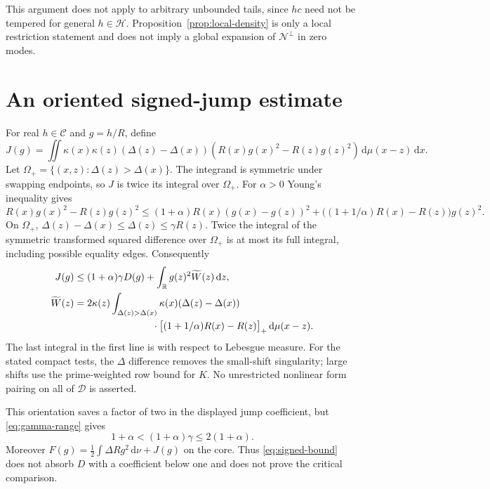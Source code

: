 \documentclass[11pt,a4paper]{article}
\newcommand{\R}{\mathbb R}
\newcommand{\HH}{\mathcal H}
\newcommand{\DD}{\mathcal D}
\newcommand{\CC}{\mathcal C}
\newcommand{\NN}{\mathcal N}
\newcommand{\dd}{\,\mathrm d}
\theoremstyle{definition}
\theoremstyle{remark}
\numberwithin{equation}{section}
\begin{document}
This argument does not apply to arbitrary unbounded tails, since $hc$
need not be tempered for general $h\in\HH$. Proposition~\ref{prop:local-density}
is only a local restriction statement and does not imply a global
expansion of $\NN^\perp$ in zero modes.

\section{An oriented signed-jump estimate}\label{app:signed}

For real $h\in\CC$ and $g=h/R$, define
\begin{equation}\label{eq:J-signed}
 J(g)=\iint\kappa(x)\kappa(z)(\Delta(z)-\Delta(x))
             (R(x)g(x)^2-R(z)g(z)^2)\dd\mu(x-z)\dd x.
\end{equation}
Let $\Omega_+=\{(x,z):\Delta(z)>\Delta(x)\}$. The integrand is symmetric
under swapping endpoints, so $J$ is twice its integral over $\Omega_+$.
For $\alpha>0$ Young's inequality gives
\[
 R(x)g(x)^2-R(z)g(z)^2
 \le(1+\alpha)R(x)(g(x)-g(z))^2
       +\bigl((1+1/\alpha)R(x)-R(z)\bigr)g(z)^2.
\]
On $\Omega_+$, $\Delta(z)-\Delta(x)\le\Delta(z)\le\gamma R(z)$.
Twice the integral of the symmetric transformed squared difference over
$\Omega_+$ is at most its full integral, including possible equality edges.
Consequently
\begin{align}\label{eq:signed-bound}
 J(g)&\le(1+\alpha)\gamma D(g)+\int_\R g(z)^2\widetilde W(z)\dd z,\notag\\
 \widetilde W(z)&=2\kappa(z)\int_{\Delta(z)>\Delta(x)}
       \kappa(x)(\Delta(z)-\Delta(x))\notag\\
 &\hspace{28mm}\cdot\bigl[(1+1/\alpha)R(x)-R(z)\bigr]_+
                                                  \dd\mu(x-z).
\end{align}
The last integral in the first line is with respect to Lebesgue measure.
For the stated compact tests, the $\Delta$ difference removes the small-shift
singularity; large shifts use the prime-weighted row bound for $K$.
No unrestricted nonlinear form pairing on all of $\DD$ is asserted.

This orientation saves a factor of two in the displayed jump coefficient,
but \eqref{eq:gamma-range} gives
\[
 1+\alpha<(1+\alpha)\gamma\le2(1+\alpha).
\]
Moreover $F(g)=\tfrac12\int\Delta Rg^2\dd\nu+J(g)$ on the core.
Thus \eqref{eq:signed-bound} does not absorb $D$ with a coefficient below
one and does not prove the critical comparison.
\end{document}
